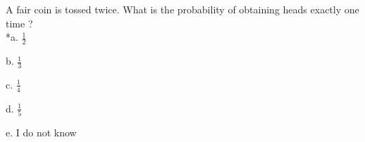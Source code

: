 
A fair coin is tossed twice. What is the probability of obtaining
heads exactly one time ? \\

*a. \(\frac{1}{2}\)

b. \(\frac{1}{3}\)

c. \(\frac{1}{4}\)

d. \(\frac{1}{5}\)

e. I do not know \\
